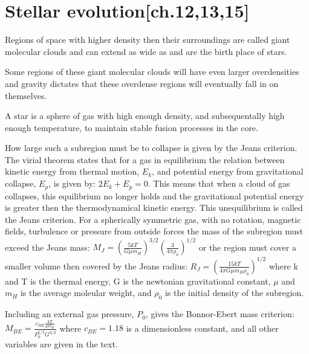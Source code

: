 \section{Stellar evolution\cite{carrol2007}[ch.12,13,15]}

Regions of space with higher density then their surroundings are called giant molecular clouds and can extend as wide as  and are the birth place of stars.

Some regions of these giant molecular clouds will have even larger overdensities and gravity dictates that these overdense regions will eventually fall in on themselves.

A star is a sphere of gas with high enough density, and subsequentally high enough temperature, to maintain stable fusion processes in the core.

How large such a subregion must be to collapse is given by the Jeans criterion. The virial theorem states that for a gas in equilibrium the relation between kinetic energy from thermal motion, $E_k$, and potential energy from gravitational collapse, $E_p$, is given by: $2E_k + E_p = 0$.
This means that when a cloud of gas collapses, this equilibrium no longer holds and the gravitational potential energy is greater then the thermodynamical kinetic energy. This unequilibrium is called the Jeans criterion.
For a spherically symmetric gas, with no rotation, magnetic fields, turbulence or pressure from outside forces the mass of the subregion must exceed the Jeans mass:
$M_J = \left(\frac{5kT}{G\mu m_H}\right)^{3/2}\left(\frac{3}{4\pi \rho_0}\right)^{1/2}$
or the region must cover a smaller volume then covered by the Jeans radius:
$R_J = \left(\frac{15kT}{4\pi G\mu m_H\rho_0}\right)^{1/2}$
where k and T is the thermal energy, G is the newtonian gravitational constant, $\mu$ and $m_H$ is the average moleular weight, and $\rho_0$ is the initial density of the subregion.

Including an external gas pressure, $P_0$, gives the Bonnor-Ebert mass criterion:
$M_{BE} = \frac{c_{BE}\frac{kT}{\mu m_H}}{P_0^{1/2}G^{3/2}}$
where $c_{BE}=1.18$ is a dimensionless constant, and all other variables are given in the text.

